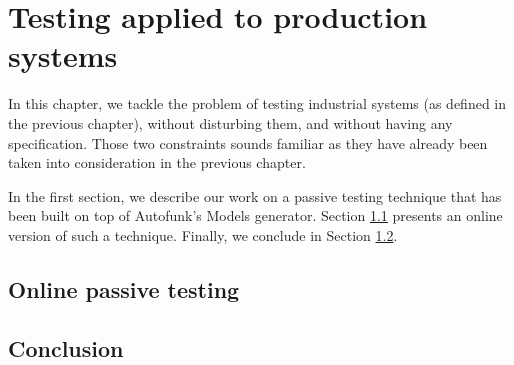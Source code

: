 %
\chapter{Testing applied to production systems}
\label{sec:testing}


In this chapter, we tackle the problem of testing industrial
systems (as defined in the previous chapter), without disturbing
them, and without having any specification. Those two constraints
sounds familiar as they have already been taken into
consideration in the previous chapter.

In the first section, we describe our work on a passive testing
technique that has been built on top of Autofunk's Models
generator. Section \ref{sec:testing:onpassive} presents an online
version of such a technique. Finally, we conclude in Section
\ref{sec:testing:conclusion}.

\label{sec:testing:onpassive}



\section{Online passive testing}
\label{sec:testing:onpassive}


\section{Conclusion}
\label{sec:testing:conclusion}
